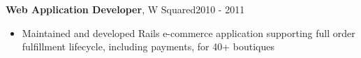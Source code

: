 \documentclass[line, margin, 10pt]{res}
\begin{document}
\begin{resume}
{\bf Web Application Developer}, W Squared\hfill 2010 - 2011
\begin{itemize} \itemsep -2pt
\item Maintained and developed Rails e-commerce application supporting full order fulfillment lifecycle, including payments, for 40+ boutiques
\end{itemize}






\end{resume}
\end{document}
